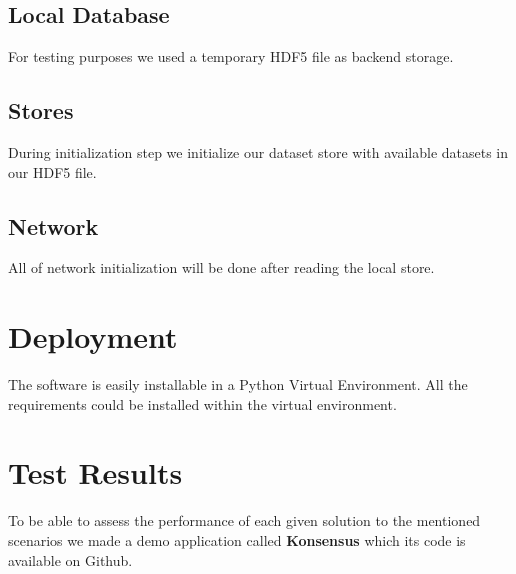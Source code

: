 \subsection{Local Database}
For testing purposes we used a temporary HDF5 file as backend storage.
\subsection{Stores}
During initialization step we initialize our dataset store with available datasets in our HDF5 file.
\subsection{Network}
All of network initialization will be done after reading the local store.



\section{Deployment}
The software is easily installable in a Python Virtual Environment. 
All the requirements could be installed within the virtual environment.

\section{Test Results}
To be able to assess the performance of each given solution to the mentioned scenarios we made a demo application
called \textbf{Konsensus} which its code is available on Github. \cite{konsensus}

